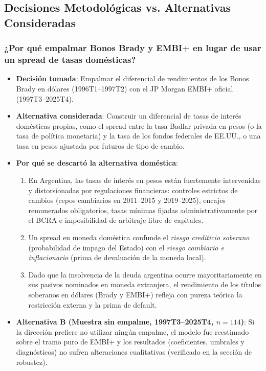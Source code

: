 \documentclass[11pt,a4paper]{article}
\begin{document}
\subsection{Decisiones Metodológicas vs. Alternativas Consideradas}

\subsubsection{¿Por qué empalmar Bonos Brady y EMBI+ en lugar de usar un spread de tasas domésticas?}
\begin{itemize}[leftmargin=1.5em]
    \item \textbf{Decisión tomada}: Empalmar el diferencial de rendimientos de los Bonos Brady en dólares (1996T1--1997T2) con el JP Morgan EMBI+ oficial (1997T3--2025T4).
    \item \textbf{Alternativa considerada}: Construir un diferencial de tasas de interés domésticas propias, como el spread entre la tasa Badlar privada en pesos (o la tasa de política monetaria) y la tasa de los fondos federales de EE.UU., o una tasa en pesos ajustada por futuros de tipo de cambio.
    \item \textbf{Por qué se descartó la alternativa doméstica}:
    \begin{enumerate}
        \item En Argentina, las tasas de interés en pesos están fuertemente intervenidas y distorsionadas por regulaciones financieras: controles estrictos de cambios (cepos cambiarios en 2011--2015 y 2019--2025), encajes remunerados obligatorios, tasas mínimas fijadas administrativamente por el BCRA e imposibilidad de arbitraje libre de capitales.
        \item Un spread en moneda doméstica confunde el \textit{riesgo crediticio soberano} (probabilidad de impago del Estado) con el \textit{riesgo cambiario e inflacionario} (prima de devaluación de la moneda local).
        \item Dado que la insolvencia de la deuda argentina ocurre mayoritariamente en sus pasivos nominados en moneda extranjera, el rendimiento de los títulos soberanos en dólares (Brady y EMBI+) refleja con pureza teórica la restricción externa y la prima de default.
    \end{enumerate}
    \item \textbf{Alternativa B (Muestra sin empalme, 1997T3--2025T4, $n=114$)}: Si la dirección prefiere no utilizar ningún empalme, el modelo fue reestimado sobre el tramo puro de EMBI+ y los resultados (coeficientes, umbrales y diagnósticos) no sufren alteraciones cualitativas (verificado en la sección de robustez).
\end{itemize}
\end{document}
